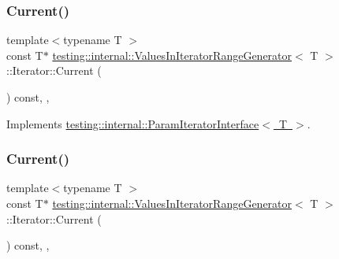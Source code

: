 \subsubsection{\texorpdfstring{Current()}{Current()}\hspace{0.1cm}{\footnotesize\ttfamily [2/3]}}
{\footnotesize\ttfamily template$<$typename T $>$ \\
const T$\ast$ \mbox{\hyperlink{classtesting_1_1internal_1_1_values_in_iterator_range_generator}{testing\+::internal\+::\+Values\+In\+Iterator\+Range\+Generator}}$<$ T $>$\+::Iterator\+::\+Current (\begin{DoxyParamCaption}{ }\end{DoxyParamCaption}) const\hspace{0.3cm}{\ttfamily [inline]}, {\ttfamily [override]}, {\ttfamily [virtual]}}



Implements \mbox{\hyperlink{classtesting_1_1internal_1_1_param_iterator_interface_adfff808576d929085679c315b255af7e}{testing\+::internal\+::\+Param\+Iterator\+Interface$<$ T $>$}}.

\mbox{\label{classtesting_1_1internal_1_1_values_in_iterator_range_generator_1_1_iterator_a55bd2a0d5a630478e32ec2efe08e37e4}} 
\subsubsection{\texorpdfstring{Current()}{Current()}\hspace{0.1cm}{\footnotesize\ttfamily [3/3]}}
{\footnotesize\ttfamily template$<$typename T $>$ \\
const T$\ast$ \mbox{\hyperlink{classtesting_1_1internal_1_1_values_in_iterator_range_generator}{testing\+::internal\+::\+Values\+In\+Iterator\+Range\+Generator}}$<$ T $>$\+::Iterator\+::\+Current (\begin{DoxyParamCaption}{ }\end{DoxyParamCaption}) const\hspace{0.3cm}{\ttfamily [inline]}, {\ttfamily [override]}, {\ttfamily [virtual]}}



